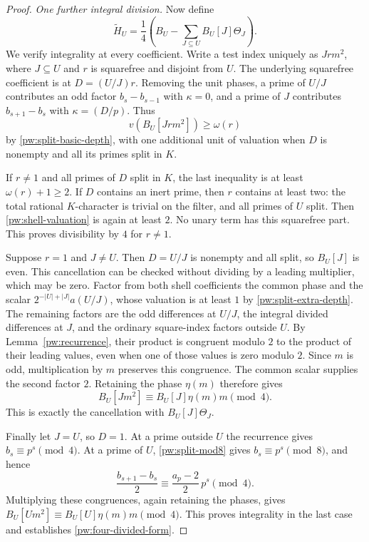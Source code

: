 \begin{proof}
\emph{One further integral division.}
Now define
\begin{equation}\label{pw:four-divided-form}
 \widetilde H_U=\frac14
 \left(B_U-\sum_{J\subseteq U}B_U[J]\Theta_J\right).
\end{equation}
We verify integrality at every coefficient.  Write a test index uniquely
as $Jrm^2$, where $J\subseteq U$ and $r$ is squarefree and disjoint from
$U$.  The underlying squarefree coefficient is at
$D=(U/J)r$.  Removing the unit phases, a prime of $U/J$ contributes an odd
factor $b_s-b_{s-1}$ with $\kappa=0$, and a prime of $J$ contributes
$b_{s+1}-b_s$ with $\kappa=(D/p)$.  Thus
\begin{equation}\label{pw:shell-valuation}
 v(B_U[Jrm^2])\ge\omega(r)
\end{equation}
by \eqref{pw:split-basic-depth}, with one additional unit of valuation
when $D$ is nonempty and all its primes split in $K$.

If $r\ne1$ and all primes of $D$ split in $K$, the last inequality is
at least $\omega(r)+1\ge2$.  If $D$ contains an inert prime, then $r$
contains at least two: the total rational $K$-character is trivial on
the filter, and all primes of $U$ split.  Then
\eqref{pw:shell-valuation} is again at least $2$.  No unary term has
this squarefree part.  This proves divisibility by $4$ for $r\ne1$.

Suppose $r=1$ and $J\ne U$.  Then $D=U/J$ is nonempty and all split,
so $B_U[J]$ is even.  This cancellation can be checked without dividing
by a leading multiplier, which may be zero.  Factor from both shell
coefficients the common phase and the scalar
$2^{-|U|+|J|}a(U/J)$, whose valuation is at least $1$ by
\eqref{pw:split-extra-depth}.  The remaining factors are the odd
differences at $U/J$, the integral divided differences at $J$, and
the ordinary square-index factors outside $U$.  By
Lemma~\ref{pw:recurrence}, their product is congruent modulo $2$ to
the product of their leading values, even when one of those values
is zero modulo $2$.  Since $m$ is odd, multiplication by $m$ preserves
this congruence.  The common scalar supplies the second factor $2$.
Retaining the phase $\eta(m)$ therefore gives
\[
 B_U[Jm^2]\equiv B_U[J]\eta(m)m\pmod4.
\]
This is exactly the cancellation with $B_U[J]\Theta_J$.

Finally let $J=U$, so $D=1$.  At a prime outside $U$ the recurrence gives
$b_s\equiv p^s\pmod4$.  At a prime of $U$,
\eqref{pw:split-mod8} gives $b_s\equiv p^s\pmod8$, and hence
\[
 \frac{b_{s+1}-b_s}{2}
 \equiv \frac{a_p-2}{2}\,p^s\pmod4.
\]
Multiplying these congruences, again retaining the phases, gives
$B_U[Um^2]\equiv B_U[U]\eta(m)m\pmod4$.  This proves integrality in
the last case and establishes \eqref{pw:four-divided-form}.


\end{proof}
